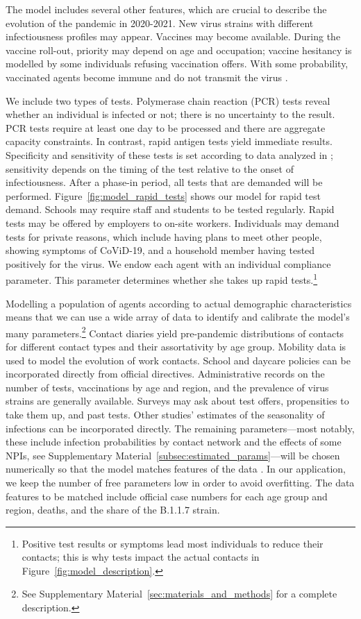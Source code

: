 The model includes several other features, which are crucial to describe the evolution of
the pandemic in 2020-2021. New virus strains with different infectiousness profiles may
appear. Vaccines may become available. During the vaccine roll-out, priority may depend
on age and occupation; vaccine hesitancy is modelled by some individuals refusing
vaccination offers. With some probability, vaccinated agents become immune and do not
transmit the virus \citep{Hunter2021, LevineTiefenbrun2021, Petter2021, Pritchard2021}.

We include two types of tests. Polymerase chain reaction (PCR) tests reveal whether an
individual is infected or not; there is no uncertainty to the result. PCR tests require
at least one day to be processed and there are aggregate capacity constraints. In
contrast, rapid antigen tests
yield immediate results. Specificity and
sensitivity of these tests is set
according to data analyzed in \cite{Bruemmer2021, Smith2021}; sensitivity depends on the
timing of the test relative to the onset of infectiousness. After a phase-in period, all
tests that are demanded will be performed. Figure~\ref{fig:model_rapid_tests} shows our
model for rapid test demand. Schools may require staff and students to be tested
regularly. Rapid tests may be offered by
employers to on-site workers. Individuals may demand tests for private reasons, which
include having plans to meet other people, showing symptoms of CoViD-19, and a household
member having tested positively for the virus. We endow each agent with an individual
compliance parameter. This parameter determines whether she takes up rapid
tests.\footnote{Positive test results or symptoms lead most individuals to reduce their
    contacts; this is why tests impact the actual contacts in
    Figure~\ref{fig:model_description}.}

Modelling a population of agents according to actual demographic characteristics means
that we can use a wide array of data to identify and calibrate the model's many
parameters.\footnote{See Supplementary Material~\ref{sec:materials_and_methods} for a
    complete description.} Contact diaries yield pre-pandemic distributions of contacts for
different contact types and their assortativity by age group. Mobility data is used to
model the evolution of work contacts. School and daycare policies can be incorporated
directly from official directives. Administrative records on the number of tests,
vaccinations by age and region, and the prevalence of virus strains are generally
available. Surveys may ask about test offers, propensities to take them up, and past
tests. Other studies' estimates of the seasonality of infections can be incorporated
directly. The remaining parameters---most notably, these include infection probabilities
by contact network and the effects of some NPIs, see Supplementary
Material~\ref{subsec:estimated_params}---will be chosen numerically so that the model
matches features of the data \citep[see][for the general method]{McFadden1989}. In our
application, we keep the number of free parameters low in order to avoid overfitting.
The data features to be matched include official case numbers for each age group and
region, deaths, and the share of the B.1.1.7 strain.

